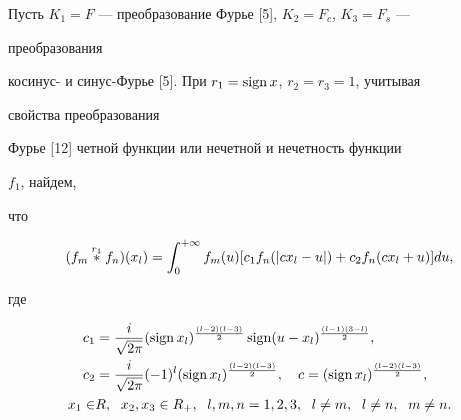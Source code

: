 \begin{exam}


Пусть $K_1=F$ --- преобразование Фурье [5], $K_2=F_c$, $K_3=F_s$ ---


преобразования


косинус- и синус-Фурье [5]. При $r_1=\operatorname{sign} x$, $r_2=r_3=1$, учитывая


свойства преобразования


Фурье [12] четной функции или нечетной и нечетность функции


$f_1$, найдем,


что


$$


(f_m\up{r_1}{}f_n)(x_l)=\int^{+\infty}_0 f_m(u)[c_1f_n


(|cx_l-u|)+c_2f_n(cx_l+u)]du,


$$


где


\begin{align*}


c_1&=\frac{i}{\sqrt{2\pi}}(\sign x_l)^{\frac{(l-2)(l-3)}{2}}


\sign(u-x_l)^{\frac{(l-1)(3-l)}{2}},\\


c_2&=\frac{i}{\sqrt{2\pi}}(-1)^l(\sign x_l)^{\frac{(l-2)(l-3)}{2}},


\quad c=(\sign x_l)^{\frac{(l-2)(l-3)}{2}},\\


x_1\in &R,\ \; x_2,x_3\in R_+,\ \; l,m,n=1,2,3,\ \;


l\ne m,\ \; l\ne n,\ \; m\ne n.


\end{align*}


\end{exam}





